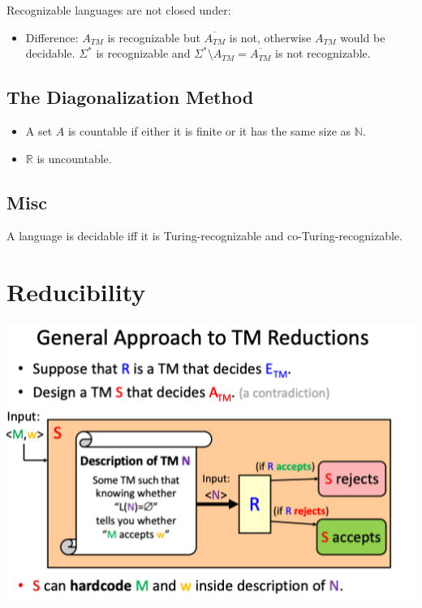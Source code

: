 \documentclass[10pt,landscape,a4paper]{article}
\newcommand{\R}{\mathbb{R}}
\newcommand{\N}{\mathbb{N}}
\begin{document}
\begin{multicols*}{3}
Recognizable languages are not closed under:

\begin{itemize}
    \item Difference: $A_{TM}$ is recognizable but $\overline{A_{TM}}$ is not, otherwise $A_{TM}$ would be decidable. $\Sigma^*$ is recognizable and $\Sigma^* \setminus A_{TM} = \overline{A_{TM}}$ is not recognizable.
\end{itemize}

\subsection{The Diagonalization Method}

\begin{itemize}
    \item A set $A$ is countable if either it is finite or it has the same size as $\N$.
    \item $\R$ is uncountable.
\end{itemize}

\subsection{Misc}

A language is decidable iff it is Turing-recognizable and co-Turing-recognizable.

\section{Reducibility}

\includegraphics[scale=0.5]{general_approach_to_tm_reductions}


\end{multicols*}
\end{document}
